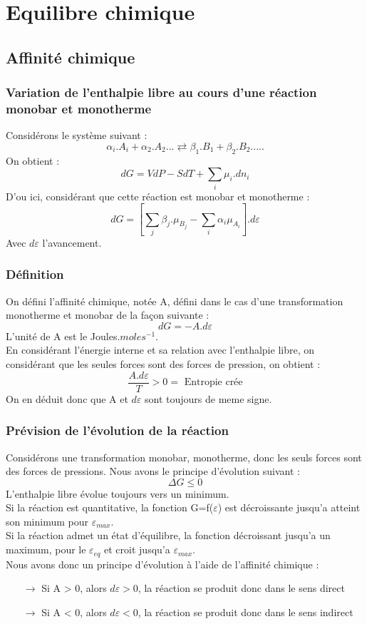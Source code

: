 
\chapter{Equilibre chimique}

\section{Affinité chimique}
\subsection{Variation de l'enthalpie libre au cours d'une réaction monobar et monotherme}
Considérons le système suivant : 
$$\alpha_i.A_i + \alpha_2.A_2  ... \rightleftarrows \beta_1.B_1 + \beta_2.B_2 .....$$
On obtient :
$$dG = VdP-SdT + \sum_i \mu_i.dn_i$$
D'ou ici, considérant que cette réaction est monobar et monotherme :
$$dG = [\sum_j \beta_j.\mu_{B_j} - \sum_i \alpha_i \mu_{A_i}].d\varepsilon$$
Avec $d\varepsilon$ l'avancement.
\subsection{Définition}
\begin{de}
On défini l'affinité chimique, notée A, défini dans le cas d'une transformation monotherme et monobar de la façon suivante : 
$$dG = -A.d\varepsilon$$
L'unité de A est le Joules.$moles^{-1}$.\\
En considérant l'énergie interne et sa relation avec l'enthalpie libre, on considérant que les seules forces sont des forces de pression, on obtient : 
$$\dfrac{A.d\varepsilon}{T} > 0 = \mbox{ Entropie crée}$$
On en déduit donc que A et $d\varepsilon$ sont toujours de meme signe.
\end{de}
\subsection{Prévision de l'évolution de la réaction}
Considérons une transformation monobar, monotherme, donc les seuls forces sont des forces de pressions. Nous avons le principe d'évolution suivant : 
$$\Delta G \leq 0$$
L'enthalpie libre évolue toujours vers un minimum.\\
Si la réaction est quantitative, la fonction G=f($\varepsilon$) est décroissante jusqu'a atteint son minimum pour $\varepsilon_{max}$.\\
Si la réaction admet un état d'équilibre, la fonction décroissant jusqu'a un maximum, pour le $\varepsilon_{eq}$ et croit jusqu'a $\varepsilon_{max}$.\\
Nous avons donc un principe d'évolution à l'aide de l'affinité chimique :\\
\begin{itemize}
 \item[$\rightarrow$] Si A > 0, alors $d\varepsilon > 0$, la réaction se produit donc dans le sens direct
 \item[$\rightarrow$] Si A < 0, alors $d\varepsilon < 0$, la réaction se produit donc dans le sens indirect
\end{itemize}
